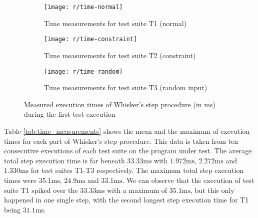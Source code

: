 \begin{figure}[htpb]
    \centering

    \begin{subfigure}{\textwidth}
        \centering
        \texttt{[image: r/time-normal]}
        \vspace{-\medskipamount}
        \caption{Time measurements for test suite T1 (normal)}
    \end{subfigure}

    \bigskip

    \begin{subfigure}{\textwidth}
        \centering
        \texttt{[image: r/time-constraint]}
        \vspace{-\medskipamount}
        \caption{Time measurements for test suite T2 (constraint)}
    \end{subfigure}

    \bigskip

    \begin{subfigure}{\textwidth}
        \centering
        \texttt{[image: r/time-random]}
        \vspace{-\medskipamount}
        \caption{Time measurements for test suite T3 (random input)}
    \end{subfigure}

    \caption{Measured execution times of Whisker's step procedure (in ms) during the first test execution}
    \label{fig:time_line_plot}
\end{figure}

\clearpage

Table \ref{tab:time_measurements} shows the mean and the maximum of execution times for each part of Whisker's step procedure.
This data is taken from ten consecutive executions of each test suite on the program under test.
The average total step execution time is far beneath $33.33\text{ms}$ with $1.972\text{ms}$, $2.272\text{ms}$ and $1.330\text{ms}$ for test suites T1-T3 respectively.
The maximum total step execution times were $35.1\text{ms}$, $24.9\text{ms}$ and $33.1\text{ms}$.
We can observe that the execution of test suite T1 spiked over the $33.33\text{ms}$ with a maximum of $35.1\text{ms}$,
but this only happened in one single step, with the second longest step execution time for T1 being $31.1\text{ms}$.

